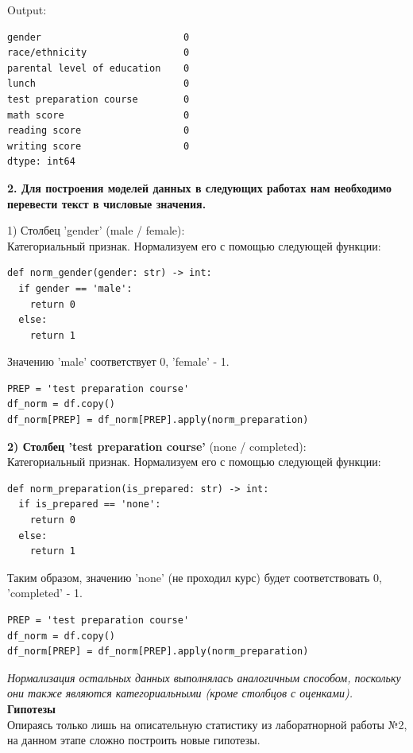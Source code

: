 \documentclass[12pt,a4paper]{article}
\begin{document}
Output:
\begin{verbatim}
gender                         0
race/ethnicity                 0
parental level of education    0
lunch                          0
test preparation course        0
math score                     0
reading score                  0
writing score                  0
dtype: int64
\end{verbatim}

\textbf{2. Для построения моделей данных в следующих работах нам необходимо перевести текст в числовые значения.}

1) Столбец 'gender' (male / female): \\
Категориальный признак.
Нормализуем его с помощью следующей функции:

\begin{verbatim}
def norm_gender(gender: str) -> int:
  if gender == 'male':
    return 0
  else:
    return 1
\end{verbatim}

Значению 'male' соответствует 0, 'female' - 1.

\begin{verbatim}
PREP = 'test preparation course'
df_norm = df.copy()
df_norm[PREP] = df_norm[PREP].apply(norm_preparation)
\end{verbatim}


\textbf{2) Столбец 'test preparation course'} (none / completed): \\
Категориальный признак.
Нормализуем его с помощью следующей функции:

\begin{verbatim}
def norm_preparation(is_prepared: str) -> int:
  if is_prepared == 'none':
    return 0
  else:
    return 1
\end{verbatim}

Таким образом, значению 'none' (не проходил курс) будет соответствовать 0, 'completed' - 1.

\begin{verbatim}
PREP = 'test preparation course'
df_norm = df.copy()
df_norm[PREP] = df_norm[PREP].apply(norm_preparation)
\end{verbatim}

\textit{Нормализация остальных данных выполнялась аналогичным способом, поскольку они также являются категориальными (кроме столбцов с оценками).}\\

\textbf{Гипотезы}\\
Опираясь только лишь на описательную статистику из лаборатнорной работы №2, на данном этапе сложно построить новые гипотезы.
\end{document}

